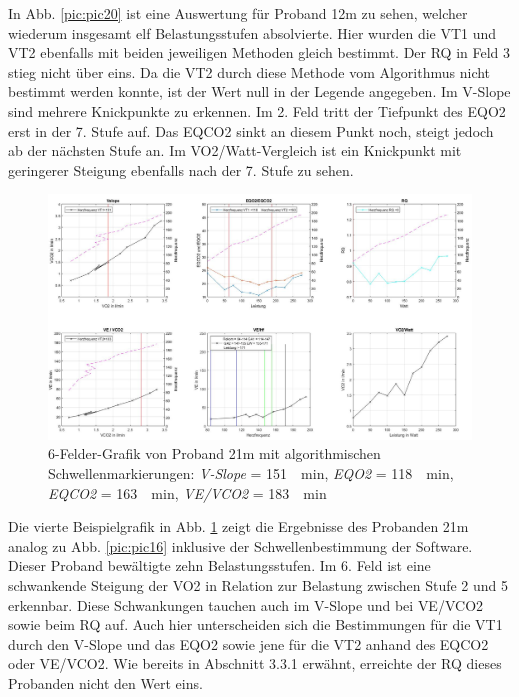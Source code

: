 %
In Abb. \ref{pic:pic20} ist eine Auswertung für Proband 12m zu sehen, welcher wiederum insgesamt elf Belastungsstufen absolvierte. Hier wurden die VT1 und VT2 ebenfalls mit beiden jeweiligen Methoden gleich bestimmt. Der RQ in Feld 3 stieg nicht über eins. Da die VT2 durch diese Methode vom Algorithmus nicht bestimmt werden konnte, ist der Wert null in der Legende angegeben. Im V-Slope sind mehrere Knickpunkte zu erkennen. Im 2. Feld tritt der Tiefpunkt des \gls{EQO2} erst in der 7. Stufe auf. Das \gls{EQCO2} sinkt an diesem Punkt noch, steigt jedoch ab der nächsten Stufe an. Im \gls{VO2}/Watt-Vergleich ist ein Knickpunkt mit geringerer Steigung ebenfalls nach der 7. Stufe zu sehen.
%
\begin{figure}[H]
	\centering
	\noindent\includegraphics[angle=0,width=\linewidth,keepaspectratio]{Bilder/auto_21}
	\caption[6-Felder-Grafik von Proband 21m mit algorithmischen Schwellenmarkierungen]{6-Felder-Grafik von Proband 21m mit algorithmischen Schwellenmarkierungen: \textsl{V-Slope} = \SI{151}{\per\minute}, \textsl{\gls{EQO2}} = \SI{118}{\per\minute}, \textsl{\gls{EQCO2}} = \SI{163}{\per\minute}, \textsl{\gls{VE}/\gls{VCO2}} = \SI{183}{\per\minute}}
	\label{pic:pic21}
\end{figure}
%
Die vierte Beispielgrafik in Abb. \ref{pic:pic21} zeigt die Ergebnisse des Probanden 21m analog zu Abb. \ref{pic:pic16} inklusive der Schwellenbestimmung der Software. Dieser Proband bewältigte zehn Belastungsstufen. Im 6. Feld ist eine schwankende Steigung der \gls{VO2} in Relation zur Belastung zwischen Stufe 2 und 5 erkennbar. Diese Schwankungen tauchen auch im V-Slope und bei \gls{VE}/\gls{VCO2} sowie beim RQ auf. Auch hier unterscheiden sich die Bestimmungen für die VT1 durch den V-Slope und das \gls{EQO2} sowie jene für die VT2 anhand des \gls{EQCO2} oder \gls{VE}/\gls{VCO2}. Wie bereits in Abschnitt 3.3.1 erwähnt, erreichte der RQ dieses Probanden nicht den Wert eins.
%
